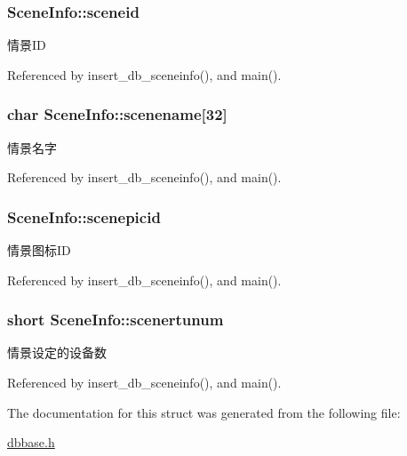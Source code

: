 \hypertarget{structSceneInfo_a647950844b5a2503b7c79171273eddbc}{
\subsubsection[{sceneid}]{ Scene\-Info\-::sceneid}}\label{structSceneInfo_a647950844b5a2503b7c79171273eddbc}


情景\-I\-D 



Referenced by insert\-\_\-db\-\_\-sceneinfo(), and main().

\hypertarget{structSceneInfo_a802bb02389ef76cdb6c30676eb65148b}{
\subsubsection[{scenename}]{\setlength{\rightskip}{0pt plus 5cm}char Scene\-Info\-::scenename\mbox{[}32\mbox{]}}}\label{structSceneInfo_a802bb02389ef76cdb6c30676eb65148b}


情景名字 



Referenced by insert\-\_\-db\-\_\-sceneinfo(), and main().

\hypertarget{structSceneInfo_affa07c03b993f4fee2824da9bf11da25}{
\subsubsection[{scenepicid}]{ Scene\-Info\-::scenepicid}}\label{structSceneInfo_affa07c03b993f4fee2824da9bf11da25}


情景图标\-I\-D 



Referenced by insert\-\_\-db\-\_\-sceneinfo(), and main().

\hypertarget{structSceneInfo_afebc902163663be26075199ba2c97d5d}{
\subsubsection[{scenertunum}]{\setlength{\rightskip}{0pt plus 5cm}short Scene\-Info\-::scenertunum}}\label{structSceneInfo_afebc902163663be26075199ba2c97d5d}


情景设定的设备数 



Referenced by insert\-\_\-db\-\_\-sceneinfo(), and main().



The documentation for this struct was generated from the following file\-:\begin{DoxyCompactItemize}
\item 
\hyperlink{dbbase_8h}{dbbase.\-h}\end{DoxyCompactItemize}
